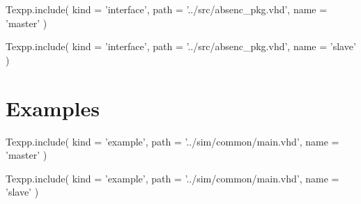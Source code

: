\documentclass[12pt]{article}
\begin{document}
\begin{texpp}
Texpp.include(
 kind = 'interface',
 path = '../src/absenc_pkg.vhd',
 name = 'master'
)
\end{texpp}

\begin{texpp}
Texpp.include(
 kind = 'interface',
 path = '../src/absenc_pkg.vhd',
 name = 'slave'
)
\end{texpp}


\newpage
\section{Examples}

\begin{texpp}
Texpp.include(
 kind = 'example',
 path = '../sim/common/main.vhd',
 name = 'master'
)
\end{texpp}

\begin{texpp}
Texpp.include(
 kind = 'example',
 path = '../sim/common/main.vhd',
 name = 'slave'
)
\end{texpp}
\end{document}
